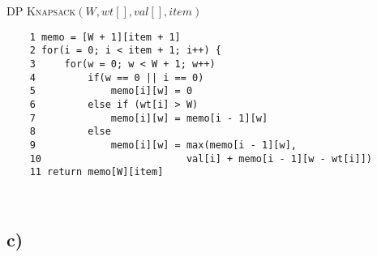\documentclass{article}
\begin{document}
\textsc{DP Knapsack$(W, wt[], val[], item)$}

\begin{verbatim}
    1 memo = [W + 1][item + 1]
    2 for(i = 0; i < item + 1; i++) {
    3     for(w = 0; w < W + 1; w++)
    4         if(w == 0 || i == 0)
    5             memo[i][w] = 0
    6         else if (wt[i] > W)
    7             memo[i][w] = memo[i - 1][w]
    8         else
    9             memo[i][w] = max(memo[i - 1][w],
    10                         val[i] + memo[i - 1][w - wt[i]])
    11 return memo[W][item]
\end{verbatim}

\begin{verbatim}
    
\end{verbatim}

\subsection*{c)}
\end{document}

